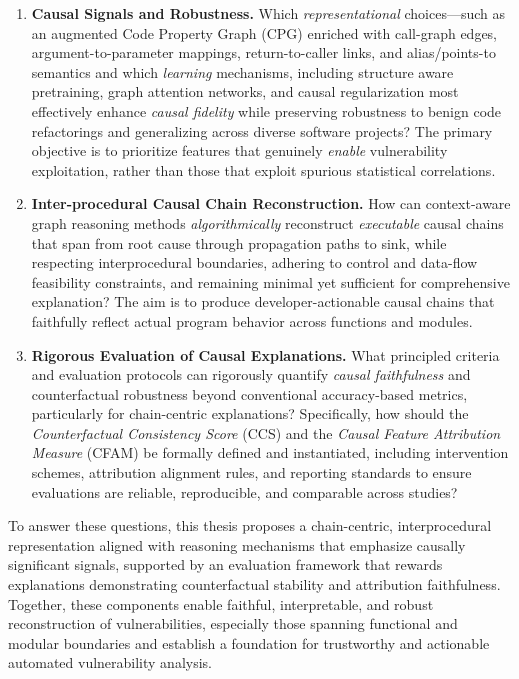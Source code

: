 \documentclass{buthesis}
\begin{document}
\begin{enumerate}
  \item \textbf{Causal Signals and Robustness.}  
  Which \emph{representational} choices—such as an augmented Code Property Graph (CPG) enriched with call-graph edges, argument-to-parameter mappings, return-to-caller links, and alias/points-to semantics and which \emph{learning} mechanisms, including structure aware pretraining, graph attention networks, and causal regularization most effectively enhance \emph{causal fidelity} while preserving robustness to benign code refactorings and generalizing across diverse software projects? The primary objective is to prioritize features that genuinely \emph{enable} vulnerability exploitation, rather than those that exploit spurious statistical correlations.

  \item \textbf{Inter-procedural Causal Chain Reconstruction.}  
  How can context-aware graph reasoning methods \emph{algorithmically} reconstruct \emph{executable} causal chains that span from root cause through propagation paths to sink, while respecting interprocedural boundaries, adhering to control and data-flow feasibility constraints, and remaining minimal yet sufficient for comprehensive explanation? The aim is to produce developer-actionable causal chains that faithfully reflect actual program behavior across functions and modules.

  \item \textbf{Rigorous Evaluation of Causal Explanations.}  
  What principled criteria and evaluation protocols can rigorously quantify \emph{causal faithfulness} and counterfactual robustness beyond conventional accuracy-based metrics, particularly for chain-centric explanations? Specifically, how should the \emph{Counterfactual Consistency Score} (CCS) and the \emph{Causal Feature Attribution Measure} (CFAM) be formally defined and instantiated, including intervention schemes, attribution alignment rules, and reporting standards to ensure evaluations are reliable, reproducible, and comparable across studies?
\end{enumerate}


To answer these questions, this thesis proposes a chain-centric, interprocedural representation aligned with reasoning mechanisms that emphasize causally significant signals, supported by an evaluation framework that rewards explanations demonstrating counterfactual stability and attribution faithfulness. Together, these components enable faithful, interpretable, and robust reconstruction of vulnerabilities, especially those spanning functional and modular boundaries and establish a foundation for trustworthy and actionable automated vulnerability analysis.
\end{document}
